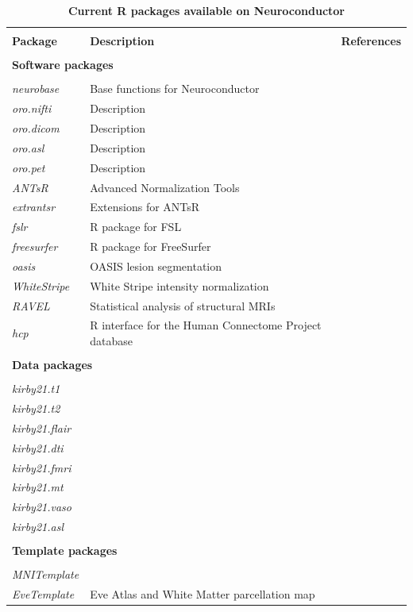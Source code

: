 \documentclass[]{elsarticle} %
\newcommand{\pkg}[1]{\emph{#1}}
\begin{document}
\begin{table}[!ht]
\centering
\caption{\textbf{Current R packages available on Neuroconductor}}\label{tab:packages}
\begin{tabular}{lll}
\hline \\[-2ex]
\textbf{Package} & \textbf{Description}   & \textbf{References} \\
\hline \\ [-1.5ex]
\multicolumn{3}{l}{\textbf{Software packages}}\\
\\ [-1.5ex]
\pkg{neurobase} & Base functions for Neuroconductor  &   \\
\pkg{oro.nifti} & Description  &  \citep{oro.nifti} \\
\pkg{oro.dicom} & Description  &  \citep{oro.nifti} \\
\pkg{oro.asl} & Description  &   \\
\pkg{oro.pet} & Description  &   \\
\pkg{ANTsR} & Advanced Normalization Tools  & \citep{ants} \\
\pkg{extrantsr} & Extensions for ANTsR  &  \\
\pkg{fslr} & R package for FSL  & \citep{fslr,fsl} \\
\pkg{freesurfer} & R package for FreeSurfer  & \citep{freesurfer} \\
\pkg{oasis} & OASIS lesion segmentation & \citep{oasis}\\
\pkg{WhiteStripe} & White Stripe intensity normalization  & \citep{whitestripe} \\
\pkg{RAVEL} & Statistical analysis of structural MRIs  & \citep{ravel} \\
\pkg{hcp} & R interface for the Human Connectome Project database &  \\
\hline \\ [-1.5ex]
\multicolumn{3}{l}{\textbf{Data packages}}\\
\\ [-1.5ex]
\pkg{kirby21.t1} &   & \citep{kirby}  \\
\pkg{kirby21.t2} &   &  \citep{kirby} \\
\pkg{kirby21.flair} &   &  \citep{kirby} \\
\pkg{kirby21.dti} &   &  \citep{kirby} \\
\pkg{kirby21.fmri} &   &  \citep{kirby} \\
\pkg{kirby21.mt} &   &  \citep{kirby} \\
\pkg{kirby21.vaso} &   &  \citep{kirby} \\
\pkg{kirby21.asl} &   &  \citep{kirby} \\
\hline \\ [-1.5ex]
\multicolumn{3}{l}{\textbf{Template packages}}\\
\\ [-1.5ex]
\pkg{MNITemplate} &   &   \\
\pkg{EveTemplate} & Eve Atlas and White Matter parcellation map  & \citep{eve}  \\
\end{tabular}
\end{table}
\end{document}
